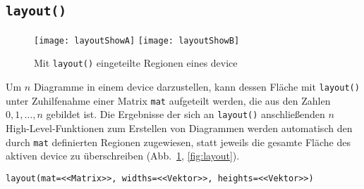 \subsection{\texttt{layout()}}

\begin{figure}[ht]
\centering
\texttt{[image: layoutShowA]}
\texttt{[image: layoutShowB]}
\vspace*{-0.5em}
\caption{Mit \lstinline!layout()! eingeteilte Regionen eines device
\label{fig:layoutShow}}
\end{figure}

Um $n$ Diagramme in einem device darzustellen, kann dessen Fläche mit \lstinline!layout()! unter Zuhilfenahme einer Matrix \lstinline!mat! aufgeteilt werden, die aus den Zahlen $0, 1, \ldots, n$ gebildet ist. Die Ergebnisse der sich an \lstinline!layout()! anschließenden $n$ High-Level-Funktionen zum Erstellen von Diagrammen werden automatisch den durch \lstinline!mat! definierten Regionen zugewiesen, statt jeweils die gesamte Fläche des aktiven device zu überschreiben (Abb.\ \ref{fig:layoutShow}, \ref{fig:layout}).
\begin{lstlisting}
layout(mat=<<Matrix>>, widths=<<Vektor>>, heights=<<Vektor>>)
\end{lstlisting}

